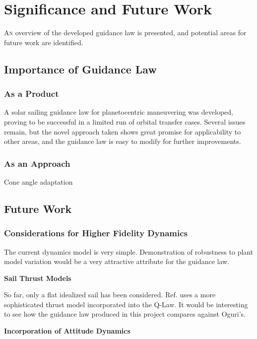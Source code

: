 \chapter{Significance and Future Work}

\lettrine{A}{n} overview of the developed guidance law is presented, and potential areas for future work are identified.


\section{Importance of Guidance Law}

\subsection{As a Product}
A solar sailing guidance law for planetocentric maneuvering was developed, proving to be successful in a limited run of orbital transfer cases. Several issues remain, but the novel approach taken shows great promise for applicability to other areas, and the guidance law is easy to modify for further improvements.

\subsection{As an Approach}
Cone angle adaptation



\section{Future Work}

\subsection{Considerations for Higher Fidelity Dynamics}


The current dynamics model is very simple. Demonstration of robustness to plant model variation would be a very attractive attribute for the guidance law.

\textbf{Sail Thrust Models}

So far, only a flat idealized sail has been considered. Ref. \cite{oguri2023solar} uses a more sophisticated thrust model incorporated into the Q-Law. It would be interesting to see how the guidance law produced in this project compares against Oguri's.


\textbf{Incorporation of Attitude Dynamics}

